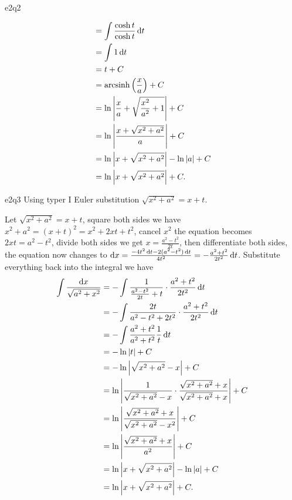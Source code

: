 \documentclass[reqno]{alittlebear}
\begin{document}
\begin{exercise}{}{}
\begin{question}{}{e2q2}
\begin{mathnote}
\begin{align*}
                &=\int \frac{\cosh t}{\cosh t} \mathop{}\!\mathrm{d} t\\
                &=\int 1\mathop{}\!\mathrm{d} t\\
                &=t+C\\ 
                &=\operatorname{arcsinh}\left(\frac{x}{a}\right)+C\\
                &=\ln\left|\frac{x}{a}+\sqrt{\frac{x^2}{a^2}+1}\right|+C\\
                &=\ln\left|\frac{x+\sqrt{x^2+a^2}}{a}\right|+C\\
                &=\ln\left|x+\sqrt{x^2+a^2}\right|-\ln\left|a\right|+C\\
                &=\ln\left|x+\sqrt{x^2+a^2}\right|+C.\\
            \end{align*}
        \end{mathnote}
    \end{question}
    \begin{question}{}{e2q3}
        Using typer I Euler substitution $\sqrt{x^2+a^2}=x+t$.
        \qbreak
        \begin{mathnote}
            Let $\sqrt{x^2+a^2}=x+t$, square both sides we have $x^2+a^2=(x+t)^2=x^2+2xt+t^2$, cancel $x^2$ the equation becomes $2xt=a^2-t^2$, divide both sides we get $x=\frac{a^2-t^2}{2t}$, then differentiate both sides, the equation now changes to $\mathop{}\!\mathrm{d} x = \frac{-4t^2\mathop{}\!\mathrm{d} t - 2(a^2-t^2)\mathop{}\!\mathrm{d} t}{4t^2}=-\frac{a^2+t^2}{2t^2}\mathop{}\!\mathrm{d} t$. Substitute everything back into the integral we have \begin{align*}
                \int \frac{\mathop{}\!\mathrm{d} x}{\sqrt{a^2+x^2}} &= -\int \frac{1}{\frac{a^2-t^2}{2t}+t}\cdot\frac{a^2+t^2}{2t^2}\mathop{}\!\mathrm{d} t\\
                &=-\int \frac{2t}{a^2-t^2+2t^2}\cdot\frac{a^2+t^2}{2t^2}\mathop{}\!\mathrm{d} t\\
                &=-\int \frac{a^2+t^2}{a^2+t^2}\frac{1}{t}\mathop{}\!\mathrm{d} t\\
                &=-\ln\left|t\right|+C\\
                &=-\ln\left|\sqrt{x^2+a^2}-x\right|+C\\
                &=\ln\left|\frac1{\sqrt{x^2+a^2}-x}\cdot\frac{\sqrt{x^2+a^2}+x}{\sqrt{x^2+a^2}+x}\right|+C\\
                &=\ln\left|\frac{\sqrt{x^2+a^2}+x}{\sqrt{x^2+a^2}-x^2}\right|+C\\
                &=\ln\left|\frac{\sqrt{x^2+a^2}+x}{a^2}\right|+C\\
                &=\ln\left|x+\sqrt{x^2+a^2}\right|-\ln\left|a\right|+C\\
                &=\ln\left|x+\sqrt{x^2+a^2}\right|+C.\\
            \end{align*}
        \end{mathnote}
    \end{question}


\end{exercise}
\end{document}
